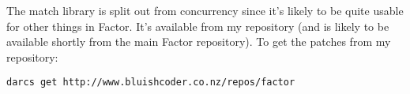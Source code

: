 The match library is split out from concurrency since it's likely to
be quite usable for other things in Factor. It's available from my
repository (and is likely to be available shortly from the main Factor
repository). To get the patches from my repository:

\begin{verbatim}
darcs get http://www.bluishcoder.co.nz/repos/factor
\end{verbatim}
